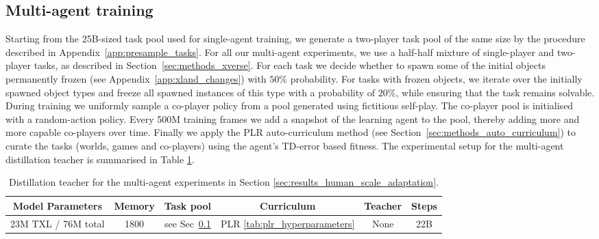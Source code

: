 \documentclass[11pt, a4paper, logo, copyright]{deepmind}
\begin{document}
\begin{appendix}
\subsection{Multi-agent training}
\label{app:multi_agent_training}
Starting from the 25B-sized task pool used for single-agent training, we generate a two-player task pool of the same size by the procedure described in Appendix~\ref{app:presample_tasks}. For all our multi-agent experiments, we use a half-half mixture of single-player and two-player tasks, as described in Section~\ref{sec:methods_xverse}. For each task we decide whether to spawn some of the initial objects permanently frozen (see Appendix~\ref{app:xland_changes}) with $50\%$ probability. For tasks with frozen objects, we iterate over the initially spawned object types and freeze all spawned instances of this type with a probability of $20\%$, while ensuring that the task remains solvable.
During training we uniformly sample a co-player policy from a pool generated using fictitious self-play. The co-player pool is initialised with a random-action policy. Every 500M training frames we add a snapshot of the learning agent to the pool, thereby adding more and more capable co-players over time. Finally we apply the PLR auto-curriculum method (see Section~\ref{sec:methods_auto_curriculum}) to curate the tasks (worlds, games and co-players) using the agent's TD-error based fitness. The experimental setup for the multi-agent distillation teacher is summarised in Table \ref{tab:multi-agent-teacher}.
\begin{table}[h!]
  \begin{center}
    \caption{Distillation teacher for the multi-agent experiments in Section \ref{sec:results_human_scale_adaptation}.}
    \begin{tabular}{c|c|c|c|c|c}
    \label{tab:multi-agent-teacher}
      Model Parameters & Memory & Task pool & Curriculum & Teacher & Steps\\
      \hline
      23M TXL / 76M total & 1800 & see Sec~\ref{app:multi_agent_training} & PLR \ref{tab:plr_hyperparameters} & None & 22B \\
    \end{tabular}
  \end{center}
\end{table}

\end{appendix}
\end{document}
